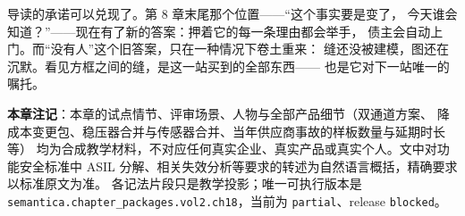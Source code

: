 导读的承诺可以兑现了。第 8 章末尾那个位置——“这个事实要是变了，
今天谁会知道？”——现在有了新的答案：押着它的每一条理由都会举手，
债主会自动上门。而“没有人”这个旧答案，只在一种情况下卷土重来：
缝还没被建模，图还在沉默。看见方框之间的缝，是这一站买到的全部东西——
也是它对下一站唯一的嘱托。


\begin{noteblock}
\textbf{本章注记}：本章的试点情节、评审场景、人物与全部产品细节（双通道方案、
降成本变更包、稳压器合并与传感器合并、当年供应商事故的样板数量与延期时长等）
均为合成教学材料，不对应任何真实企业、真实产品或真实个人。文中对功能安全标准中
ASIL 分解、相关失效分析等要求的转述为自然语言概括，精确要求以标准原文为准。
各记法片段只是教学投影；唯一可执行版本是
\nolinkurl{semantica.chapter_packages.vol2.ch18}，当前为 \nolinkurl{partial}、release \nolinkurl{blocked}。
\end{noteblock}
